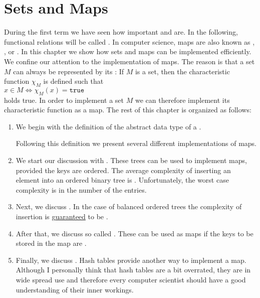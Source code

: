 \chapter{Sets and Maps}
During the first term we have seen how important  and  are.  In the
following, functional relations will be called .  In computer science, maps are also
known as \href{https://en.wikipedia.org/wiki/Associative_array}{}, 
, or .
In this chapter we show how sets and
maps can be implemented efficiently.  We confine our attention to the implementation of maps.  The
reason is that a set $M$ can always be represented by its :  If $M$ is
a set, then the characteristic function $\chi_M$ is defined such that
\\[0.2cm]
\hspace*{1.3cm}
$x \in M \Leftrightarrow \chi_M(x) = \mathtt{true}$
\\[0.2cm]
holds true.  In order to implement a set $M$ we can therefore implement its characteristic function
as a map.  The rest of this chapter is organized as follows:
\begin{enumerate}
\item We begin with the definition of the abstract data type of a .
    
      Following this definition we present several different implementations of maps. 
\item We start our discussion with .  These trees can be used to implement maps,
      provided the keys are ordered.        The average complexity of inserting
      an element into an ordered binary tree is .  Unfortunately, the worst case complexity
      is  in the number of the entries.
\item Next, we discuss .  In the case of balanced ordered trees the
      complexity of insertion is g\underline{uaranteed} to be .
\item After that, we discuss so called .  These can be used as maps if the keys to be
      stored in the map are .
\item Finally, we discuss .  Hash tables provide another way to implement a map.
      Although I personally think that hash tables are a bit overrated, they are in wide spread use
      and therefore every computer scientist should have a good understanding of their inner workings.
\end{enumerate}

